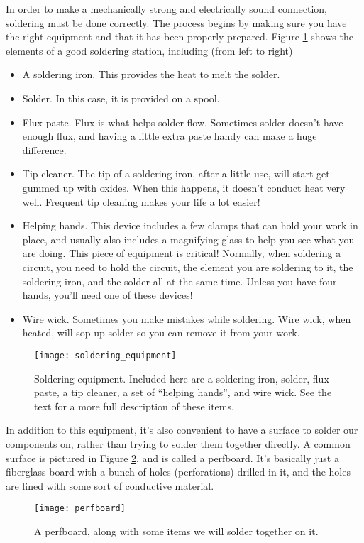 In order to make a mechanically strong and electrically sound connection, 
soldering must be done correctly. The process begins by making sure you have
the right equipment and that it has been properly prepared. Figure
\ref{fig:soldering_equipment} shows the elements of a good soldering station, 
including (from left to right)
\begin{itemize}
\item A soldering iron. This provides the heat to melt the solder.
\item Solder. In this case, it is provided on a spool.
\item Flux paste. Flux is what helps solder flow. Sometimes solder doesn't
have enough flux, and having a little extra paste handy can make a huge 
difference.
\item Tip cleaner. The tip of a soldering iron, after a little use, will start
get gummed up with oxides. When this happens, it doesn't conduct heat very well.
Frequent tip cleaning makes your life a lot easier!
\item Helping hands. This device includes a few clamps that can hold your work
in place, and usually also includes a magnifying glass to help you see what
you are doing. This piece of equipment is critical! Normally, when soldering a
circuit, you need to hold the circuit, the element you are soldering to it, 
the soldering iron, and the solder all at the same time. Unless you have four
hands, you'll need one of these devices!
\item Wire wick. Sometimes you make mistakes while soldering. Wire wick, when 
heated, will sop up solder so you can remove it from your work.
\end{itemize}
\begin{figure}[hbp!]
\centering
\texttt{[image: soldering\_equipment]}
\caption[Soldering equipment]{Soldering equipment. Included here are
a soldering iron, solder, flux paste, a tip cleaner, a set of ``helping
hands'', and wire wick. See the text for a more full description of these
items.}
\label{fig:soldering_equipment}
\end{figure}

In addition to this equipment, it's also convenient to have a surface to 
solder our components on, rather than trying to solder them together directly.
A common surface is pictured in Figure \ref{fig:perfboard}, and is called a
perfboard. It's basically just a fiberglass board with a bunch of holes
(perforations) drilled in it, and the holes are lined with some sort of 
conductive material.
\begin{figure}[hbp!]
\centering
\texttt{[image: perfboard]}
\caption[A perfboard]{A perfboard, along with some items we will solder
together on it.}
\label{fig:perfboard}
\end{figure}

